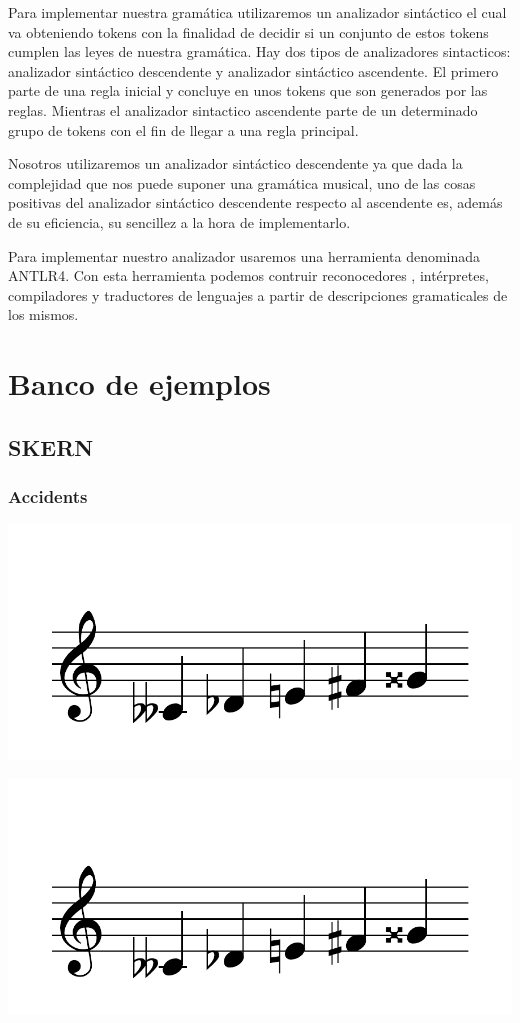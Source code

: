 \documentclass{article}
\begin{document}
Para implementar nuestra gramática utilizaremos un analizador sintáctico el cual va obteniendo tokens con la finalidad de
decidir si un conjunto de estos tokens cumplen las leyes de nuestra gramática. Hay dos tipos de analizadores sintacticos:
analizador sintáctico descendente y analizador sintáctico ascendente. El primero parte de una regla inicial y concluye en unos
tokens que son generados por las reglas. Mientras el analizador sintactico ascendente parte de un determinado grupo de tokens con
el fin de llegar a una regla principal.

Nosotros utilizaremos un analizador sintáctico descendente ya que dada la complejidad que nos puede suponer una gramática musical,
uno de las cosas positivas del analizador sintáctico descendente respecto al ascendente es, además de su eficiencia, su sencillez a
la hora de implementarlo. 

Para implementar nuestro analizador usaremos una herramienta denominada ANTLR4. Con esta herramienta podemos contruir reconocedores
, intérpretes, compiladores y traductores de lenguajes a partir de descripciones gramaticales de los mismos.

\section{Banco de ejemplos}
\subsection{SKERN}
\subsubsection{Accidents}
\includegraphics[scale=0.5]{figures_tests/pdf/skern/accident1.pdf}

\includegraphics[scale=0.5]{figures_tests/pdf/skern/accident2.pdf}
\end{document}
